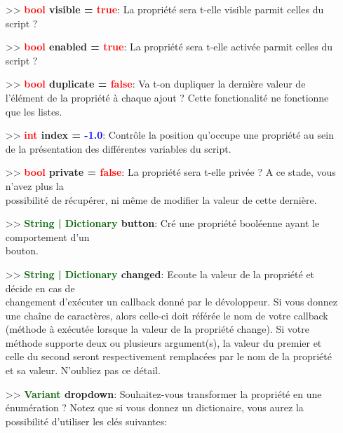 \documentclass[a4paper, 11pt]{article}
\begin{document}
\begin{description}
\begin{itemize}
\begin{itemize}
				\item[>> \textbf{\textcolor{red}{bool} visible = \textcolor{red}{true}}:] La propriété sera
				t-elle visible parmit celles du script ?\\
				\item[>> \textbf{\textcolor{red}{bool} enabled = \textcolor{red}{true}}:] La propriété sera
				t-elle activée parmit celles du script ?\\
				\item[>> \textbf{\textcolor{red}{bool} duplicate = \textcolor{red}{false}}:] Va t-on
				dupliquer la dernière valeur de l'élément de la propriété à chaque ajout ? Cette
				fonctionalité ne fonctionne que les listes.\\
				\item[>> \textbf{\textcolor{red}{int} index = \textcolor{blue}{-1.0}}:] Contrôle la position 
				qu'occupe une propriété au sein de la présentation des différentes variables du script.\\
				\item[>> \textbf{\textcolor{red}{bool} private = \textcolor{red}{false}}:] La propriété sera
				t-elle privée ? A ce stade, vous n'avez plus la \\possibilité de récupérer, ni même de 
				modifier la valeur de cette dernière.\\
				\item[>> \textbf{\textcolor{darkgreen}{String | Dictionary} button}:] Cré une propriété 
				booléenne ayant le comportement d'un \\bouton.\\
				\item[>> \textbf{\textcolor{darkgreen}{String | Dictionary} changed}:] Ecoute la valeur de 
				la propriété et décide en cas de \\changement d'exécuter un callback donné par le
				dévoloppeur. Si vous donnez une chaîne de caractères, alors celle-ci doit référée le nom de 
				votre callback (méthode à exécutée lorsque la valeur de la propriété change). Si votre 
				méthode supporte deux ou plusieurs argument(s), la valeur du premier et celle du second
				seront respectivement remplacées par le nom de la propriété et sa valeur. N'oubliez pas ce
				détail.\\
				\item[>> \textbf{\textcolor{darkgreen}{Variant} dropdown}:] Souhaitez-vous transformer la
				propriété en une énumération ? Notez que si vous donnez un dictionaire, vous aurez la
				possibilité d'utiliser les clés suivantes:

\end{itemize}
\end{itemize}
\end{description}
\end{document}
